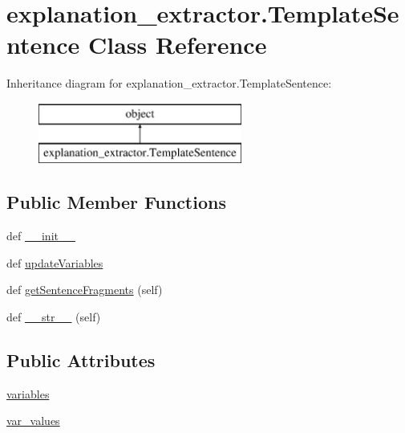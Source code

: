 \hypertarget{classexplanation__extractor_1_1_template_sentence}{}\section{explanation\+\_\+extractor.\+Template\+Sentence Class Reference}
\label{classexplanation__extractor_1_1_template_sentence}
Inheritance diagram for explanation\+\_\+extractor.\+Template\+Sentence\+:\begin{figure}[H]
\begin{center}
\leavevmode
\includegraphics[height=2.000000cm]{classexplanation__extractor_1_1_template_sentence}
\end{center}
\end{figure}
\subsection*{Public Member Functions}
\begin{DoxyCompactItemize}
\item 
def \hyperlink{classexplanation__extractor_1_1_template_sentence_a22ddd1b4767a1c72969c5c930cbda078}{\+\_\+\+\_\+init\+\_\+\+\_\+}
\item 
def \hyperlink{classexplanation__extractor_1_1_template_sentence_a927b2a0ebda999c61956ae2a86871051}{update\+Variables}
\item 
def \hyperlink{classexplanation__extractor_1_1_template_sentence_a375ab886f8b7e3c675f092af6bae1c9b}{get\+Sentence\+Fragments} (self)
\item 
def \hyperlink{classexplanation__extractor_1_1_template_sentence_ae5bcc65ffabbe8b633249977f7aa6be1}{\+\_\+\+\_\+str\+\_\+\+\_\+} (self)
\end{DoxyCompactItemize}
\subsection*{Public Attributes}
\begin{DoxyCompactItemize}
\item 
\hyperlink{classexplanation__extractor_1_1_template_sentence_a32d502eb8958b05bc1bcd24711a88bef}{variables}
\item 
\hyperlink{classexplanation__extractor_1_1_template_sentence_a767650d37189470a42a43f23917ceafb}{var\+\_\+values}
\end{DoxyCompactItemize}



